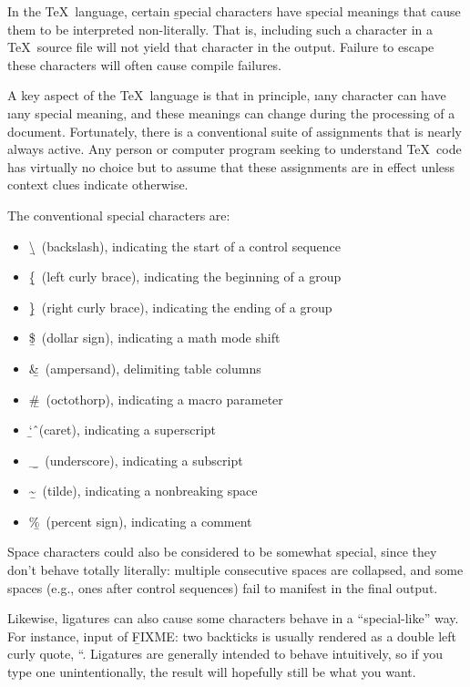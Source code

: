 
In the \TeX\ language, certain \b{special characters} have special meanings that
cause them to be interpreted non-literally. That is, including such a character
in a \TeX\ source file will not yield that character in the output. Failure to
escape these characters will often cause compile failures.

A key aspect of the \TeX\ language is that in principle, \i{any character} can
have \i{any} special meaning, and these meanings can change during the
processing of a document. Fortunately, there is a conventional suite of
assignments that is nearly always active. Any person or computer program seeking
to understand \TeX\ code has virtually no choice but to assume that these
assignments are in effect unless context clues indicate otherwise.

The conventional special characters are:
\begin{itemize}
    \item \b{\textbackslash\ (backslash)}, indicating the start of a control sequence
    \item \b{\{\ (left curly brace)}, indicating the beginning of a group
    \item \b{\}\ (right curly brace)}, indicating the ending of a group
    \item \b{\$\ (dollar sign)}, indicating a math mode shift
    \item \b{\&\ (ampersand)}, delimiting table columns
    \item \b{\#\ (octothorp)}, indicating a macro parameter
    \item \b{\char`\^\ (caret)}, indicating a superscript
    \item \b{\_\ (underscore)}, indicating a subscript
    \item \b{\textasciitilde\ (tilde)}, indicating a nonbreaking space
    \item \b{\%\ (percent sign)}, indicating a comment
\end{itemize}
Space characters could also be considered to be somewhat special, since they
don’t behave totally literally: multiple consecutive spaces are collapsed, and
some spaces (e.g., ones after control sequences) fail to manifest in the final
output.

Likewise, ligatures can also cause some characters behave in a “special-like”
way. For instance, input of \b{FIXME: two backticks} is usually rendered as a
double left curly quote, “. Ligatures are generally intended to behave
intuitively, so if you type one unintentionally, the result will hopefully still
be what you want.

